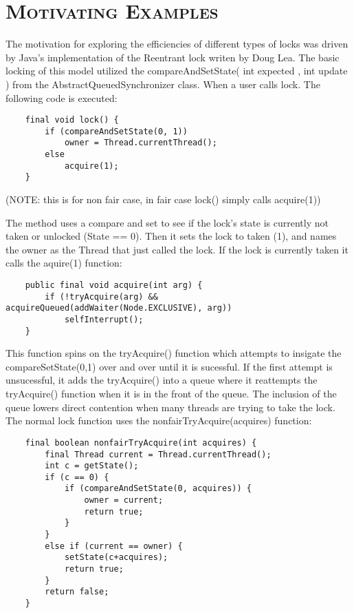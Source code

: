 \documentclass[FinalReport.tex]{subfiles}
\begin{document}
\bigskip

\section*{\textsc{\Large Motivating Examples}}

	The motivation for exploring the efficiencies of different types of locks was driven by Java's implementation of the Reentrant lock writen by Doug Lea. The basic locking of this model utilized the compareAndSetState( int expected , int update ) from the AbstractQueuedSynchronizer class. When a user calls lock. The following code is executed:
	
	\smallskip
	
	\begin{lstlisting}
	final void lock() {
        if (compareAndSetState(0, 1))
            owner = Thread.currentThread();
        else
            acquire(1);
    }
	\end{lstlisting}
	\smallskip
	(NOTE: this is for non fair case, in fair case lock() simply calls acquire(1))
	\smallskip

	The method uses a compare and set to see if the lock's state is currently not taken or unlocked (State == 0). Then it sets the lock to taken (1), and names the owner as the Thread that just called the lock. If the lock is currently taken it calls the aquire(1) function: 

	\smallskip

	\begin{lstlisting}
	public final void acquire(int arg) {
		if (!tryAcquire(arg) && acquireQueued(addWaiter(Node.EXCLUSIVE), arg))
			selfInterrupt();
	}
	\end{lstlisting}

	This function spins on the tryAcquire() function which attempts to insigate the compareSetState(0,1) over and over until it is sucessful. If the first attempt is unsucessful, it adds the tryAcquire() into a queue where it reattempts the tryAcquire() function when it is in the front of the queue. The inclusion of the queue lowers direct contention when many threads are trying to take the lock. The normal lock function uses the nonfairTryAcquire(acquires) function:
	
	\begin{lstlisting}
    final boolean nonfairTryAcquire(int acquires) { 
        final Thread current = Thread.currentThread();
        int c = getState();
        if (c == 0) {
            if (compareAndSetState(0, acquires)) {
                owner = current;
                return true;
            }
        }
        else if (current == owner) {
            setState(c+acquires);
            return true;
        }
        return false;
    }
	\end{lstlisting}
	
\end{document}
